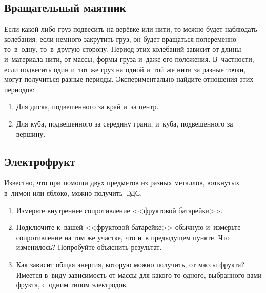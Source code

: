 \documentclass[a4paper,12pt]{article}
\begin{document}
\subsection{Вращательный маятник}
Если какой-либо груз подвесить на верёвке или нити, то можно будет наблюдать колебания:
если немного закрутить груз, он будет вращаться попеременно то~в~одну, то~в~другую сторону.
Период этих колебаний зависит от длины и~материала нити, от массы, формы груза и~даже его положения.
В~частности, если подвесить один и~тот же груз на одной и~той же нити за разные точки, могут
получиться разные периоды. Экспериментально найдите отношения этих периодов:
\begin{enumerate}
\item Для диска, подвешенного за край и~за центр.
\item Для куба, подвешенного за середину грани, и~куба, подвешенного за вершину.
\end{enumerate}

\subsection{Электрофрукт}
Известно, что при помощи двух предметов из разных металлов, воткнутых в~лимон или яблоко, можно получить~ЭДС.
\begin{enumerate}
 \item Измерьте внутреннее сопротивление <<фруктовой батарейки>>.

 \item Подключите к~вашей  <<фруктовой батарейке>> обычную и~измерьте сопротивление на том же участке,
 что и~в предыдущем пункте. Что изменилось? Попробуйте объяснить результат.

 \item Как зависит общая энергия, которую можно получить, от массы фрукта? Имеется в~виду зависимость
 от массы для какого-то одного, выбранного вами фрукта, с~одним типом электродов.
\end{enumerate}
\end{document}
